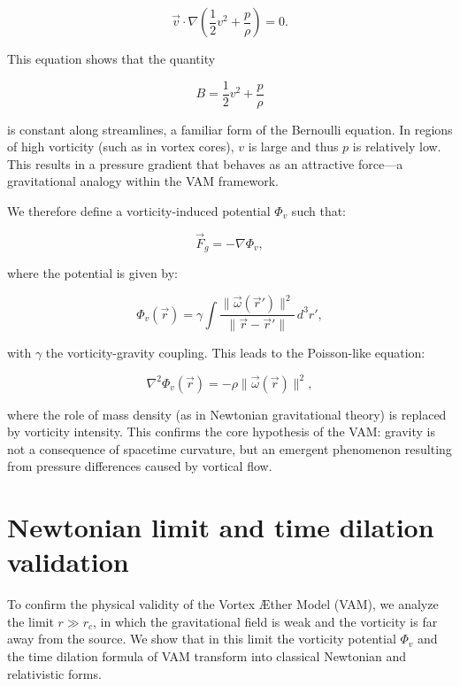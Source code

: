 \documentclass[preprint]{revtex4-2}
\begin{document}
\begin{equation}
    \vec{v} \cdot \nabla\left(\frac{1}{2}v^2 + \frac{p}{\rho}\right) = 0.
\end{equation}

This equation shows that the quantity

\begin{equation}
    B = \frac{1}{2}v^2 + \frac{p}{\rho}
\end{equation}

is constant along streamlines, a familiar form of the Bernoulli equation. In regions of high vorticity (such as in vortex cores), $v$ is large and thus $p$ is relatively low. This results in a pressure gradient that behaves as an attractive force—a gravitational analogy within the VAM framework.

We therefore define a vorticity-induced potential $\Phi_v$ such that:

\begin{equation}
    \vec{F}_g = -\nabla \Phi_v,
\end{equation}

where the potential is given by:

\begin{equation}
    \Phi_v(\vec{r}) = \gamma \int \frac{\|\vec{\omega}(\vec{r}')\|^2}{\|\vec{r} - \vec{r}'\|} \, d^3r',
\end{equation}

with $\gamma$ the vorticity-gravity coupling. This leads to the Poisson-like equation:

\begin{equation}
    \nabla^2 \Phi_v(\vec{r}) = -\rho \|\vec{\omega}(\vec{r})\|^2,
\end{equation}

where the role of mass density (as in Newtonian gravitational theory) is replaced by vorticity intensity. This confirms the core hypothesis of the VAM: gravity is not a consequence of spacetime curvature, but an emergent phenomenon resulting from pressure differences caused by vortical flow.
\section{Newtonian limit and time dilation validation}\label{sec:appendix:3}

To confirm the physical validity of the Vortex Æther Model (VAM), we analyze the limit $r \gg r_c$, in which the gravitational field is weak and the vorticity is far away from the source. We show that in this limit the vorticity potential $\Phi_v$ and the time dilation formula of VAM transform into classical Newtonian and relativistic forms.
\end{document}
